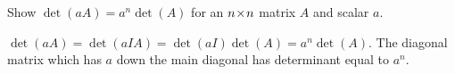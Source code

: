 
\begin{Exercise}[
name={},
title={}, 
difficulty=0,
origin={\cite{KK}}]
Show $\det \left( aA\right) =a^{n}\det \left( A\right) $ for an $n \! \times \! n$ matrix $A
$ and scalar $a$.
\end{Exercise}

\begin{Answer}
$\det \left( aA\right) =\det
\left( aIA\right) =\det \left( aI\right) \det \left( A\right) =a^{n}\det
\left( A\right) .$ The diagonal matrix which has $a$ down the main diagonal has
determinant equal to $a^{n}$.
\end{Answer}
